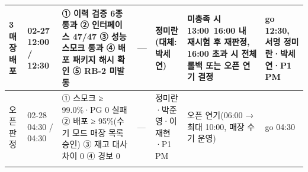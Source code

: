 \documentclass[10pt,a4paper]{article}
\begin{document}
{\begin{tabularx}{\linewidth}{|L{24mm}|L{26mm}|Y|C{13mm}|L{30mm}|L{52mm}|L{40mm}|}
\textbf{3 매장 배포} & 02-27 12:00 / \textbf{12:30} & ① 이력 검증 6종 통과 ② 인터페이스 47/47 ③ 성능 스모크 통과 ④ 배포 패키지 해시 확인 ⑤ RB-2 미발동 & — & \textbf{정미란}(대체: 박세연) & 미충족 시 13:00~16:00 내 재시험 후 재판정, 16:00 초과 시 전체 롤백 또는 오픈 연기 결정 & go 12:30, 서명 정미란·박세연·P1 PM \\ \hline
오픈 판정 & 02-28 04:30 / 04:30 & ① 스모크 ≥ 99.0\%·PG 0 실패 ② 배포 ≥ 95\%(수기 모드 매장 목록 승인) ③ 재고 대사 차이 0 ④ 경보 0 & — & 정미란·박준영·이재현·P1 PM & 오픈 연기(06:00 → 최대 10:00, 매장 수기 운영) & go 04:30 \\ \hline
\fi
\end{tabularx}}

\end{document}

